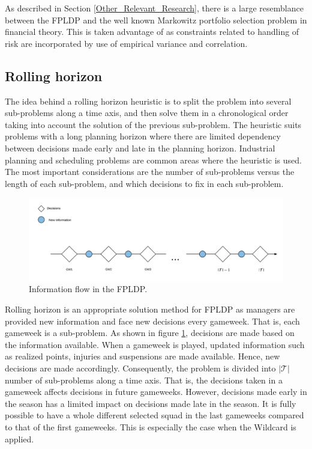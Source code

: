 \newpar

As described in Section \ref{Other_Relevant_Research}, there is a large resemblance between the FPLDP and the well known Markowitz portfolio selection problem in financial theory. This is taken advantage of as constraints related to handling of risk are incorporated by use of empirical variance and correlation. 

\subsection{Rolling horizon}

The idea behind a rolling horizon heuristic is to split the problem into several sub-problems along a time axis, and then solve them in a chronological order taking into account the solution of the previous sub-problem. The heuristic suits problems with a long planning horizon where there are limited dependency between decisions made early and late in the planning horizon. Industrial planning and scheduling problems are common areas where the heuristic is used. The most important considerations are the number of sub-problems versus the length of each sub-problem, and which decisions to fix in each sub-problem. 

\begin{figure}[H]
    \centering
    \includegraphics[scale = 0.47]{fig/chapter_5/Rolling_Horizon_Information_Flow.png}
    \caption{Information flow in the FPLDP.}
    \label{fig:information_flow}
\end{figure}

Rolling horizon is an appropriate solution method for FPLDP as managers are provided new information and face new decisions every gameweek. That is, each gameweek is a sub-problem. As shown in figure \ref{fig:information_flow}, decisions are made based on the information available. When a gameweek is played, updated information such as realized points, injuries and suspensions are made available. Hence, new decisions are made accordingly. Consequently, the problem is divided into $\mathcal{|T|}$ number of sub-problems along a time axis. That is, the decisions taken in a gameweek affects decisions in future gameweeks. However, decisions made early in the season has a limited impact on decisions made late in the season. It is fully possible to have a whole different selected squad in the last gameweeks compared to that of the first gameweeks. This is especially the case when the Wildcard is applied.

